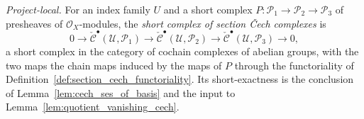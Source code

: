 \begin{definition}\leanok
  \label{def:section_cech_short_complex}
  \textit{Project-local.}
  For an index family \(U\) and a short complex
  \(P : \mathcal{P}_1 \to \mathcal{P}_2 \to \mathcal{P}_3\) of presheaves of
  \(\mathcal{O}_X\)-modules, the \emph{short complex of section {\v C}ech complexes} is
  \[
    0 \to \check{\mathcal{C}}^\bullet(\mathcal{U}, \mathcal{P}_1) \to
      \check{\mathcal{C}}^\bullet(\mathcal{U}, \mathcal{P}_2) \to
      \check{\mathcal{C}}^\bullet(\mathcal{U}, \mathcal{P}_3) \to 0,
  \]
  a short complex in the category of cochain complexes of abelian groups, with the two maps the
  chain maps induced by the maps of \(P\) through the functoriality of
  Definition~\ref{def:section_cech_functoriality}. Its short-exactness is the conclusion of
  Lemma~\ref{lem:cech_ses_of_basis} and the input to Lemma~\ref{lem:quotient_vanishing_cech}.
\end{definition}

